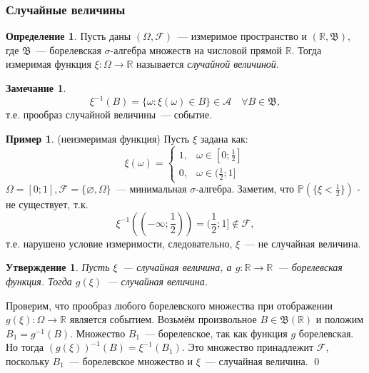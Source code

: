 \documentclass[oneside,final,14pt]{extreport}
\newcommand\myprob[1]{{\mathbb{P}(#1)}}
\renewenvironment{proof}{{\bfseries Доказательство.}}{\qed}
\theoremstyle{plain}
\newtheorem*{thm*}{Утверждение}
\theoremstyle{definition}
\newtheorem*{defn}{Определение}
\newtheorem*{exmp}{Пример}
\newtheorem*{rmrk}{Замечание}
\theoremstyle{named}
\begin{document}
\subsubsection{Случайные величины}
\begin{defn}
    Пусть даны $(\Omega, \mathcal{F})$~--- измеримое пространство и $(\mathbb{R}, \mathfrak{B})$, где $\mathfrak{B}$~--- борелевская $\sigma$-алгебра множеств на числовой прямой $\mathbb{R}$. Тогда измеримая функция $\xi: \Omega \to \mathbb{R}$ называется {\it случайной величиной}.
\end{defn}

\begin{rmrk}
\begin{equation*}
    \xi^{-1}(B) = \{\omega : \xi(\omega) \in B\} \in \mathcal{A} \quad \forall B \in \mathfrak{B},
\end{equation*}
    т.е. прообраз случайной величины~--- событие.
\end{rmrk}

\begin{exmp} (неизмеримая функция) Пусть $\xi$ задана как:
\begin{equation*}
    \xi(\omega)=\left\{\begin{array}{ll}
    1, & \omega \in [0; \frac{1}{2}] \\
    0, & \omega \in (\frac{1}{2}; 1]
\end{array}\right.
\end{equation*}
$\Omega = [0; 1], \mathcal{F} = \{\varnothing, \Omega\}$~--- минимальная $\sigma$-алгебра.  Заметим, что $\myprob{\{\xi < \frac{1}{2}\}}$ - не существует, т.к.
\begin{equation*}
    \xi^{-1}((-\infty;\frac{1}{2})) = (\frac{1}{2}; 1] \notin \mathcal{F},
\end{equation*}
т.е. нарушено условие измеримости, следовательно, $\xi$~--- не случайная величина.
\end{exmp} 

\begin{thm*}
    Пусть $\xi$~--- случайная величина, а $g: \mathbb{R} \rightarrow \mathbb{R}$~--- борелевская функция. Тогда $g(\xi)$~--- случайная величина.
\end{thm*}

\begin{proof}
    Проверим, что прообраз любого борелевского множества при отображении $g(\xi) : \Omega \rightarrow \mathbb{R}$ является событием. Возьмём произвольное $B \in \mathfrak{B}(\mathbb{R})$ и положим $B_1 = g^{-1}(B)$. Множество $B_1$~--- борелевское, так как функция $g$ борелевская. Но тогда $(g(\xi))^{-1}(B) = \xi^{-1}(B_1)$. Это множество принадлежит $\mathcal{F}$, поскольку $B_1$~--- борелевское множество и $\xi$~--- случайная величина. 
\end{proof}
\end{document}
